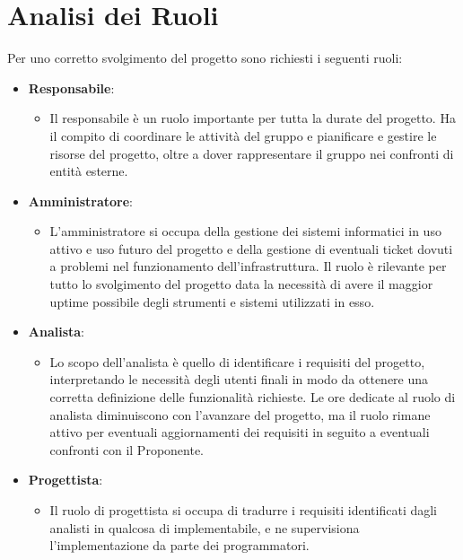 \documentclass[a4paper,12pt]{article}
\begin{document}
\section{Analisi dei Ruoli}
Per uno corretto svolgimento del progetto sono richiesti i seguenti ruoli:

\begin{itemize}
    \item \textbf{Responsabile}:
        \begin{itemize}
            \item Il responsabile è un ruolo importante per tutta la durate del progetto.
            Ha il compito di coordinare le attività del gruppo e pianificare e gestire le risorse del progetto, oltre a dover rappresentare il gruppo nei confronti di entità esterne.
        \end{itemize}

    \item \textbf{Amministratore}:
        \begin{itemize}
            \item L'amministratore si occupa della gestione dei sistemi informatici in uso attivo e uso futuro del progetto e della gestione di eventuali ticket dovuti a problemi nel funzionamento dell'infrastruttura.
            Il ruolo è rilevante per tutto lo svolgimento del progetto data la necessità di avere il maggior uptime possibile degli strumenti e sistemi utilizzati in esso.
        \end{itemize}

    \item \textbf{Analista}:
        \begin{itemize}
            \item Lo scopo dell'analista è quello di identificare i requisiti del progetto, interpretando le necessità degli utenti finali in modo da ottenere una corretta definizione delle funzionalità richieste.
            Le ore dedicate al ruolo di analista diminuiscono con l'avanzare del progetto, ma il ruolo rimane attivo per eventuali aggiornamenti dei requisiti in seguito a eventuali confronti con il Proponente.
        \end{itemize}

    \item \textbf{Progettista}:
        \begin{itemize}
            \item Il ruolo di progettista si occupa di tradurre i requisiti identificati dagli analisti in qualcosa di implementabile, e ne supervisiona l'implementazione da parte dei programmatori.
        \end{itemize}


\end{itemize}
\end{document}
